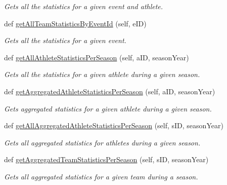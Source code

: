 \begin{DoxyCompactItemize}
\begin{DoxyCompactList}\small\item\em Gets all the statistics for a given event and athlete. \end{DoxyCompactList}\item 
def \hyperlink{classhandler_1_1soccer__event_1_1_soccer_event_handler_adcf08513902f4ef82aab9c5bf5986663}{get\+All\+Team\+Statistics\+By\+Event\+Id} (self, e\+ID)
\begin{DoxyCompactList}\small\item\em Gets all the statistics for a given event. \end{DoxyCompactList}\item 
def \hyperlink{classhandler_1_1soccer__event_1_1_soccer_event_handler_a3a100777cb6277419240d85cf05c8ebc}{get\+All\+Athlete\+Statistics\+Per\+Season} (self, a\+ID, season\+Year)
\begin{DoxyCompactList}\small\item\em Gets all the statistics for a given athlete during a given season. \end{DoxyCompactList}\item 
def \hyperlink{classhandler_1_1soccer__event_1_1_soccer_event_handler_a2ee05e2424c68a714db390b907113205}{get\+Aggregated\+Athlete\+Statistics\+Per\+Season} (self, a\+ID, season\+Year)
\begin{DoxyCompactList}\small\item\em Gets aggregated statistics for a given athlete during a given season. \end{DoxyCompactList}\item 
def \hyperlink{classhandler_1_1soccer__event_1_1_soccer_event_handler_a292389fd792d50d23a74b8d58ffde43a}{get\+All\+Aggregated\+Athlete\+Statistics\+Per\+Season} (self, s\+ID, season\+Year)
\begin{DoxyCompactList}\small\item\em Gets all aggregated statistics for athletes during a given season. \end{DoxyCompactList}\item 
def \hyperlink{classhandler_1_1soccer__event_1_1_soccer_event_handler_a48ea25068c4b1e0a2b7c422ffde73abf}{get\+Aggregated\+Team\+Statistics\+Per\+Season} (self, s\+ID, season\+Year)
\begin{DoxyCompactList}\small\item\em Gets all aggregated statistics for a given team during a season. \end{DoxyCompactList}\item 

\end{DoxyCompactItemize}
